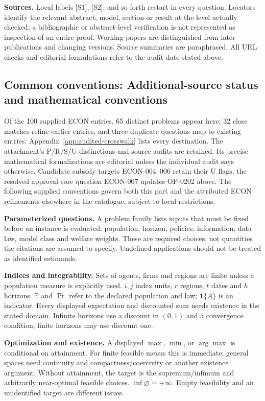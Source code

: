 \documentclass[11pt,a4paper]{article}
\begin{document}
\textbf{Sources.} Local labels [S1], [S2], and so forth restart in every question. Locators identify the relevant abstract, model, section or result at the level actually checked; a bibliographic or abstract-level verification is not represented as inspection of an entire proof. Working papers are distinguished from later publications and changing versions. Source summaries are paraphrased. All URL checks and editorial formulations refer to the audit date stated above.

\subsection*{Common conventions: Additional-source status and mathematical conventions}

\label{audited:conventions}

Of the 100 supplied ECON entries, 65 distinct problems appear here; 32 close
matches refine earlier entries, and three duplicate questions map to existing
entries. Appendix~\ref{app:audited-crosswalk} lists every destination.
The attachment's P/R/S/U distinctions and source audits are retained. Its
precise mathematical formalizations are editorial unless the individual audit
says otherwise. Candidate subsidy targets ECON-004--006 retain their U flags;
the resolved approval-core question ECON-007 updates OP-0202 above.
The following supplied conventions govern both this part and the attributed
ECON refinements elsewhere in the catalogue, subject to local restrictions.

\textbf{Parameterized questions.} A problem family lists inputs that must be fixed before an instance is evaluated: population, horizon, policies, information, data law, model class and welfare weights. These are required choices, not quantities the citations are assumed to specify. Undefined applications should not be treated as identified estimands.

\textbf{Indices and integrability.} Sets of agents, firms and regions are finite unless a population measure is explicitly used. \(i,j\) index units, \(r\) regions, \(t\) dates and \(h\) horizons. \(\mathbb E\) and \(\Pr\) refer to the declared population and law; \(\mathbf1\{A\}\) is an indicator. Every displayed expectation and discounted sum needs existence in the stated domain. Infinite horizons use a discount in \((0,1)\) and a convergence condition; finite horizons may use discount one.

\textbf{Optimization and existence.} A displayed \(\max\), \(\min\), or \(\arg\max\) is conditional on attainment. For finite feasible menus this is immediate; general spaces need continuity and compactness/coercivity or another existence argument. Without attainment, the target is the supremum/infimum and arbitrarily near-optimal feasible choices. \(\inf\varnothing=+\infty\). Empty feasibility and an unidentified target are different issues.
\end{document}
